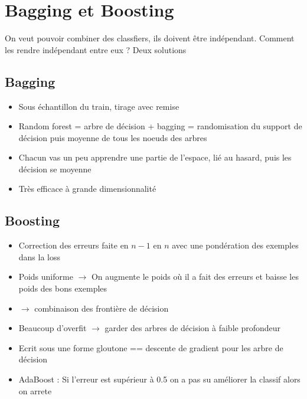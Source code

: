 \documentclass{article}
\theoremstyle{plain}%
\theoremstyle{definition}
\theoremstyle{remark}
\begin{document}
\section{Bagging et Boosting}
On veut pouvoir combiner des classfiers, ils doivent être indépendant. Comment les rendre indépendant entre eux ? Deux solutions

\subsection{Bagging}
\begin{itemize}
    \item Sous échantillon du train, tirage avec remise
    \item Random forest = arbre de décision + bagging = randomisation du support de décision puis moyenne de tous les noeuds des arbres 
    \item Chacun vas un peu apprendre une partie de l'espace, lié au hasard, puis les décision se moyenne
    \item Très efficace à grande dimensionnalité
\end{itemize}

\subsection{Boosting}
\begin{itemize}
    \item Correction des erreurs faite en $ n-1 $ en $ n $ avec une pondération des exemples dans la loss
    \item Poids uniforme $\rightarrow$ On augmente le poids où il a fait des erreurs et baisse les poids des bons exemples
    \item $\rightarrow$ combinaison des frontière de décision
    \item Beaucoup d'overfit $\rightarrow$ garder des arbres de décision à faible profondeur
    \item Ecrit sous une forme gloutone == descente de gradient pour les arbre de décision 
    \item AdaBoost : Si l'erreur est supérieur à 0.5 on a pas su améliorer la classif alors on arrete
\end{itemize}
\end{document}

